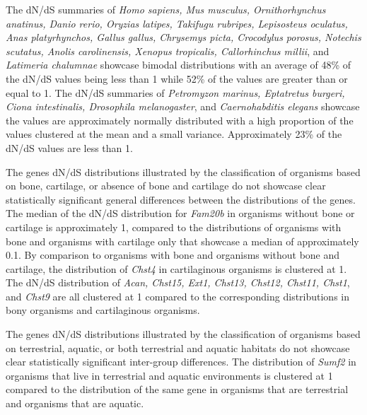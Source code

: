 \documentclass{article}
\begin{document}
The dN/dS summaries of \textit{Homo sapiens, Mus musculus, Ornithorhynchus anatinus, Danio rerio, Oryzias latipes, Takifugu rubripes, Lepisosteus oculatus, Anas platyrhynchos, Gallus gallus, Chrysemys picta, Crocodylus porosus, Notechis scutatus, Anolis carolinensis, Xenopus tropicalis, Callorhinchus millii}, and \textit{Latimeria chalumnae} showcase bimodal distributions with an average of 48\% of the dN/dS values being less than 1 while 52\% of the values are greater than or equal to 1. The dN/dS summaries of \textit{Petromyzon marinus, Eptatretus burgeri, Ciona intestinalis, Drosophila melanogaster}, and \textit{Caernohabditis elegans} showcase the values are approximately normally distributed with a high proportion of the values clustered at the mean and a small variance. Approximately 23\% of the dN/dS values are less than 1. 

The genes dN/dS distributions illustrated by the classification of organisms based on bone, cartilage, or absence of bone and cartilage do not showcase clear statistically significant general differences between the distributions of the genes. The median of the dN/dS distribution for \textit{Fam20b} in organisms without bone or cartilage is approximately 1, compared to the distributions of organisms with bone and organisms with cartilage only that showcase a median of approximately 0.1. By comparison to organisms with bone and organisms without bone and cartilage, the distribution of \textit{Chst4} in cartilaginous organisms is clustered at 1. The dN/dS distribution of \textit{Acan, Chst15, Ext1, Chst13, Chst12, Chst11, Chst1}, and \textit{Chst9} are all clustered at 1 compared to the corresponding distributions in bony organisms and cartilaginous organisms. 

The genes dN/dS distributions illustrated by the classification of organisms based on terrestrial, aquatic, or both terrestrial and aquatic habitats do not showcase clear statistically significant inter-group differences. The distribution of \textit{Sumf2} in organisms that live in terrestrial and aquatic environments is clustered at 1 compared to the distribution of the same gene in organisms that are terrestrial and organisms that are aquatic. 
\end{document}
